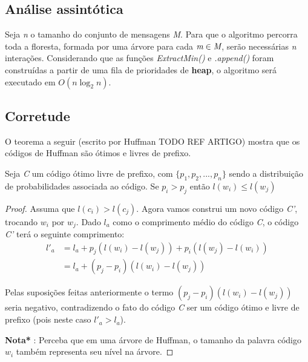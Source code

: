 \subsection{Análise assintótica}
Seja \emph{n} o tamanho do conjunto de mensagens \emph{M}. 
Para que o algoritmo percorra toda a floresta, formada por uma árvore para cada $\emph{m} \in \emph{M}$, serão necessárias \emph{n} interações.
Considerando que as funções \emph{ExtractMin()} e \emph{.append()} foram construídas a partir de uma fila de prioridades de \textbf{heap}, o algoritmo será executado em  $O(n \log_2 n)$.

\subsection{Corretude}
O teorema a seguir (escrito por Huffman TODO REF ARTIGO) mostra  que os códigos de Huffman são ótimos e livres de prefixo.


\begin{lemma} \label{lemma:dist_prob_avg_size} Seja \emph{C} um código ótimo livre de prefixo, com $\{ p_1, p_2,..., p_n\}$ sendo a distribuição de probabilidades associada ao código. 
Se $p_i > p_j$ então $l(w_i) \leq l(w_j)$

\begin{proof} 
Assuma que $l(c_i) > l(c_j)$. 
Agora vamos construi um novo código \emph{C'}, trocando $w_i$ por $w_j$. Dado $l_a$ como o comprimento médio do código \emph{C}, o código \emph{C'} terá o seguinte comprimento:
\begin{align*}
l'_a &= l_a + p_j(l(w_i) - l(w_j)) + p_i(l(w_j) - l(w_i)) \\
&= l_a + (p_j - p_i)(l(w_i) - l(w_j)) 
\end{align*}

Pelas suposições feitas anteriormente o termo $(p_j - p_i)(l(w_i) - l(w_j))$ seria negativo, contradizendo o fato do código \emph{C} ser um código ótimo e livre de prefixo (pois neste caso $l'_a > l_a$).

\textbf{Nota*} : Perceba que em uma árvore de Huffman, o tamanho da palavra código $w_i$ também representa seu nível na árvore.
\end{proof}
\end{lemma}

